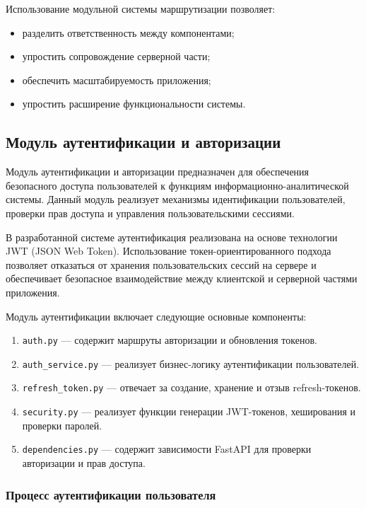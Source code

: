 Использование модульной системы маршрутизации позволяет:
\begin{itemize}
	\item разделить ответственность между компонентами;
	\item упростить сопровождение серверной части;
	\item обеспечить масштабируемость приложения;
	\item упростить расширение функциональности системы.
\end{itemize}

\subsection{Модуль аутентификации и авторизации}

Модуль аутентификации и авторизации предназначен для обеспечения безопасного доступа пользователей к функциям информационно-аналитической системы. Данный модуль реализует механизмы идентификации пользователей, проверки прав доступа и управления пользовательскими сессиями.

В разработанной системе аутентификация реализована на основе технологии JWT (JSON Web Token). Использование токен-ориентированного подхода позволяет отказаться от хранения пользовательских сессий на сервере и обеспечивает безопасное взаимодействие между клиентской и серверной частями приложения.

Модуль аутентификации включает следующие основные компоненты:
\begin{enumerate}
	\item \texttt{auth.py} — содержит маршруты авторизации и обновления токенов.
	
	\item \texttt{auth\_service.py} — реализует бизнес-логику аутентификации пользователей.
	
	\item \texttt{refresh\_token.py} — отвечает за создание, хранение и отзыв refresh-токенов.
	
	\item \texttt{security.py} — реализует функции генерации JWT-токенов, хеширования и проверки паролей.
	
	\item \texttt{dependencies.py} — содержит зависимости FastAPI для проверки авторизации и прав доступа.
\end{enumerate}

\subsubsection{Процесс аутентификации пользователя}

